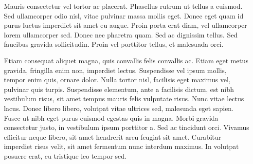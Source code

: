 \documentclass[10pt,letterpaper,notitlepage,draft]{article}
\begin{document}
Mauris consectetur vel tortor ac placerat. Phasellus rutrum ut tellus a euismod.
Sed ullamcorper odio nisl, vitae pulvinar massa mollis eget. Donec eget quam id
purus luctus imperdiet sit amet eu augue. Proin porta erat diam, vel ullamcorper
lorem ullamcorper sed. Donec nec pharetra quam. Sed ac dignissim tellus. Sed
faucibus gravida sollicitudin. Proin vel porttitor tellus, et malesuada orci.

Etiam consequat aliquet magna, quis convallis felis convallis ac. Etiam eget
metus gravida, fringilla enim non, imperdiet lectus. Suspendisse vel ipsum
mollis, tempor enim quis, ornare dolor. Nulla tortor nisl, facilisis eget
maximus vel, pulvinar quis turpis. Suspendisse elementum, ante a facilisis
dictum, est nibh vestibulum risus, sit amet tempus mauris felis vulputate risus.
Nunc vitae lectus lacus. Donec libero libero, volutpat vitae ultrices sed,
malesuada eget sapien. Fusce ut nibh eget purus euismod egestas quis in magna.
Morbi gravida consectetur justo, in vestibulum ipsum porttitor a. Sed ac
tincidunt orci. Vivamus efficitur neque libero, sit amet hendrerit arcu feugiat
sit amet. Curabitur imperdiet risus velit, sit amet fermentum nunc interdum
maximus. In volutpat posuere erat, eu tristique leo tempor sed.

\end{document}
